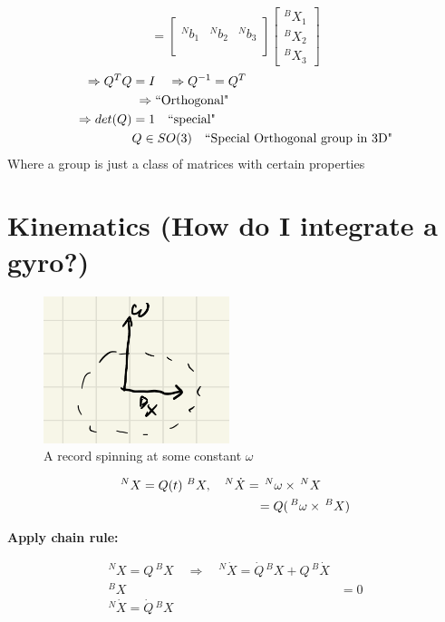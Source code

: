 \documentclass[11pt]{article}
\begin{document}
\[
=
\begin{bmatrix}
\\
    ^Nb_1 &
    ^Nb_2 &
    ^Nb_3 \\
    \\
\end{bmatrix}
\begin{bmatrix}
    ^B X_1 \\
    ^B X_2 \\
    ^B X_3
\end{bmatrix}
\]
\begin{align*}
    \Rightarrow Q^TQ &= I \quad \Rightarrow Q^{-1} = Q^T
    \\
    & \hspace{1mm} \Rightarrow \text{``Orthogonal"}
    \\
    \Rightarrow det(Q) &= 1 \quad \text{``special"}
    \\
    &Q\in SO(3) \quad\text{``Special Orthogonal group in 3D"}
\end{align*}
Where a group is just a class of matrices with certain properties

\section*{Kinematics (How do I integrate a gyro?)}
\begin{figure}[H]
    \centering
    \includegraphics[width=0.25\linewidth]{lecture_14_3.png}
    \caption{A record spinning at some constant $\omega$}
\end{figure}

\begin{align*}
^N X &= Q(t)\ ^BX,
\quad
^N \dot{X} = \, ^N \omega \times \, ^N X
\\
&\hspace{32mm}= Q (\, ^B \omega \times \, ^B X)
\end{align*}

\textbf{Apply chain rule:}

\begin{align*}
^N X = Q \, ^B X \quad \Rightarrow \quad ^N \dot{X} = \dot{Q} \, ^B X + Q \, ^B \dot{X}
\\
^B X &= 0
\\
^N \dot{X} = \dot{Q} \, ^B X
\end{align*}
\end{document}
